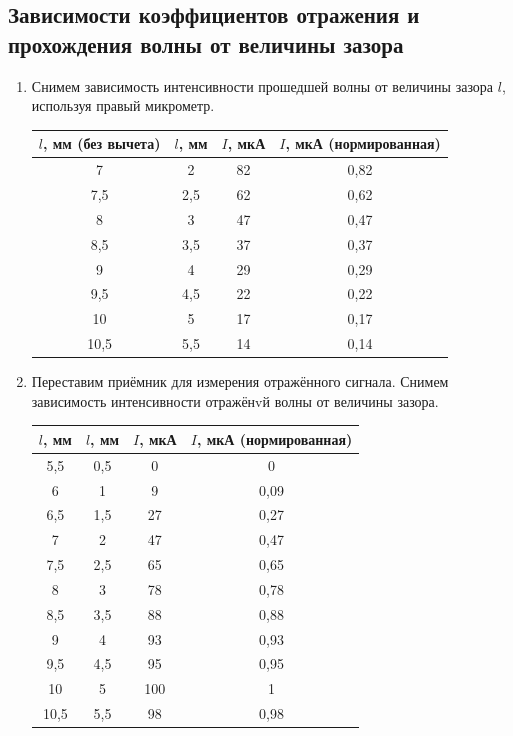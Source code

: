 \documentclass[a4paper, 12pt]{article}
\begin{document}
	\subsection{Зависимости коэффициентов отражения и прохождения волны от величины зазора}
	\begin{enumerate}
		\item Снимем зависимость интенсивности прошедшей волны от величины зазора $l$, используя правый микрометр.
		\begin{table}[h]
			\centering
				\begin{tabular}{|c|c|c|c|}
				\hline
  				$l$, мм (без вычета)& $l$, мм & $I$, мкА & $I$, мкА (нормированная)\\
  				\hline
  				7 & 2 & 82 & 0,82\\
				7,5 & 2,5 & 62 & 0,62\\
				8 & 3 & 47 & 0,47\\
				8,5 & 3,5 & 37 & 0,37\\
				9 & 4 & 29 & 0,29\\
				9,5 & 4,5 & 22 & 0,22\\
				10 & 5 & 17 & 0,17\\
				10,5 & 5,5 & 14 & 0,14\\
				\hline
			\end{tabular}
		\end{table}
		\item Переставим приёмник для измерения отражённого сигнала. Снимем зависимость интенсивности отражёнvй волны от величины зазора.
		\begin{table}[h]
			\centering
			\begin{tabular}{|c|c|c|c|}
				\hline
				$l$, мм & $l$, мм & $I$, мкА & $I$, мкА (нормированная)\\
				\hline
				5,5 & 0,5 & 0 & 0\\
				6 & 1 & 9 & 0,09\\
				6,5 & 1,5 & 27 & 0,27\\
				7 & 2 & 47 & 0,47\\
				7,5 & 2,5 & 65 & 0,65\\
				8 & 3 & 78 & 0,78\\
				8,5 & 3,5 & 88 & 0,88\\
				9 & 4 & 93 & 0,93\\
				9,5 & 4,5 & 95 & 0,95\\
				10 & 5 & 100 & 1\\
				10,5	 & 5,5 & 98 & 0,98\\
				\hline
			\end{tabular}

\end{table}
\end{enumerate}
\end{document}
